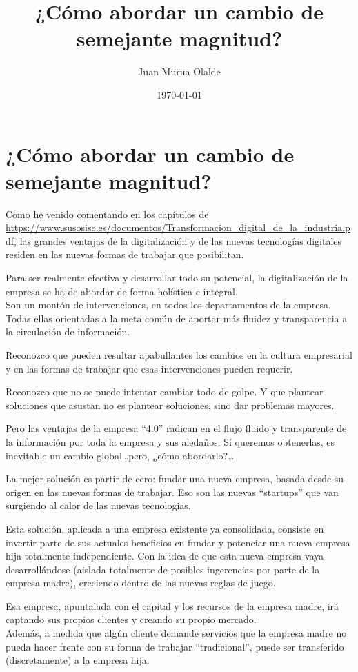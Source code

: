 \documentclass[11pt,a4paper]{article}
\title{¿Cómo abordar un cambio de semejante magnitud?}
\author{Juan Murua Olalde}
\date{\today}
\begin{document}
\section*{¿Cómo abordar un cambio de semejante magnitud?}
Como he venido comentando en los capítulos de {\footnotesize  \url{https://www.susosise.es/documentos/Transformacion_digital_de_la_industria.pdf}}, las grandes ventajas de la digitalización y de las nuevas tecnologías digitales residen en las nuevas formas de trabajar que posibilitan. 

Para ser realmente efectiva y desarrollar todo su potencial, la digitalización de la empresa se ha de abordar de forma holística e integral.
\\Son un montón de intervenciones, en todos los departamentos de la empresa. Todas ellas orientadas a la meta común de aportar más fluidez y transparencia a la circulación de información.

Reconozco que pueden resultar apabullantes los cambios en la cultura empresarial y en las formas de trabajar que esas intervenciones pueden requerir.

Reconozco que no se puede intentar cambiar todo de golpe. Y que plantear soluciones que asustan no es plantear soluciones, sino dar problemas mayores.

Pero las ventajas de la empresa ``4.0'' radican en el flujo fluido y transparente de la información por toda la empresa y sus aledaños. Si queremos obtenerlas, es inevitable un cambio global\ldots pero, ¿cómo abordarlo?\ldots 

\vspace{0.5cm}

La mejor solución es partir de cero: fundar una nueva empresa, basada desde su origen en las nuevas formas de trabajar. Eso son las nuevas ``startups'' que van surgiendo al calor de las nuevas tecnologias.

Esta solución, aplicada a una empresa existente ya consolidada, consiste en invertir parte de sus actuales beneficios en fundar y potenciar una nueva empresa hija totalmente independiente. Con la idea de que esta nueva empresa vaya desarrollándose (aislada totalmente de posibles ingerencias por parte de la empresa madre), creciendo dentro de las nuevas reglas de juego.

Esa empresa, apuntalada con el capital y los recursos de la empresa madre, irá captando sus propios clientes y creando su propio mercado.
\\Además, a medida que algún cliente demande servicios que la empresa madre no pueda hacer frente con su forma de trabajar ``tradicional'', puede ser transferido (discretamente) a la empresa hija.
\end{document}
